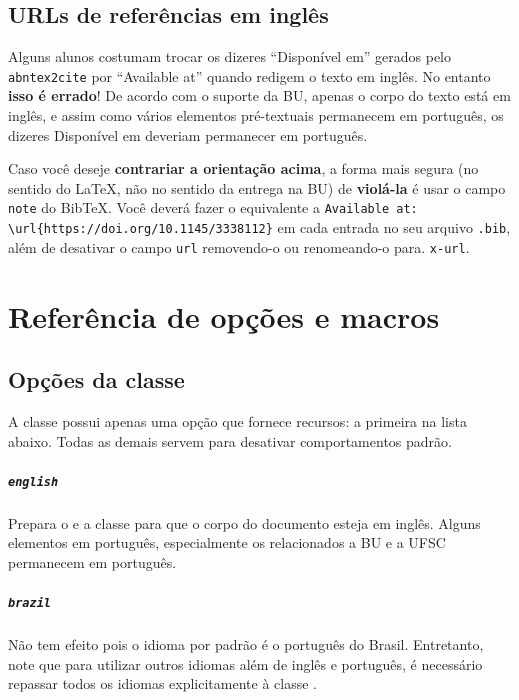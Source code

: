 \documentclass[embeddedlogo]{../ufsc-thesis-rn46-2019}
\newcommand{\lacmd}[1]{\texttt{\textbackslash{}#1}}
\begin{document}
\section{URLs de referências em inglês}

Alguns alunos costumam trocar os dizeres ``Disponível em'' gerados pelo
\texttt{abntex2cite} por ``Available at'' quando redigem o texto em inglês. No
entanto \textbf{isso é errado}! De acordo com o suporte da BU, apenas o corpo do
texto está em inglês, e assim como vários elementos pré-textuais permanecem em
português, os dizeres Disponível em deveriam permanecer em português.

Caso você deseje \textbf{contrariar a orientação acima}, a forma mais segura (no
sentido do LaTeX, não no sentido da entrega na BU) de \textbf{violá-la} é usar o
campo \texttt{note} do BibTeX. Você deverá fazer o equivalente a
\texttt{Available at: \lacmd{url}\{https://doi.org/10.1145/3338112\}} em cada
entrada no seu arquivo \texttt{.bib}, além de desativar o campo \texttt{url}
removendo-o ou renomeando-o para. \texttt{x-url}.

\chapter{Referência de opções e macros}
\label{ch:ref}

\section{Opções da classe}

A classe possui apenas uma opção que fornece recursos: a primeira na lista
abaixo. Todas as demais servem para desativar comportamentos padrão.

\paragraph*{\texttt{english}} Prepara o \abnTeX{} e a classe para que o corpo
do documento esteja em inglês. Alguns elementos em português, especialmente os
relacionados a BU e a UFSC permanecem em português.

\paragraph*{\texttt{brazil}} Não tem efeito pois o idioma por padrão é o
português do Brasil. Entretanto, note que para utilizar outros idiomas além de
inglês e português, é necessário repassar todos os idiomas explicitamente à
classe \abnTeX.
\end{document}
